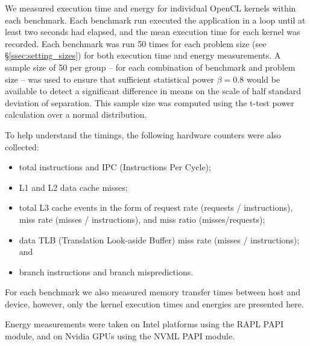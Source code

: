\documentclass[../document.tex]{subfiles}
\begin{document}
\label{ssec:measurements}


We measured execution time and energy for individual OpenCL kernels within each benchmark.
Each benchmark run executed the application in a loop until at least two seconds had elapsed, and the mean execution time for each kernel was recorded.
Each benchmark was run 50 times for each problem size (see \S\ref{ssec:setting_sizes}) for both execution time and energy measurements.
A sample size of 50 per group -- for each combination of benchmark and problem size -- was used to ensure that sufficient statistical power $\beta = 0.8$ would be available to detect a significant difference in means on the scale of half standard deviation of separation.
This sample size was computed using the t-test power calculation over a normal distribution.

To help understand the timings, the following hardware counters were also collected:
\begin{itemize}
	\item total instructions and IPC (Instructions Per Cycle);
	\item L1 and L2 data cache misses;
	\item total L3 cache events in the form of request rate (requests / instructions), miss rate (misses / instructions), and miss ratio (misses/requests);
	\item data TLB (Translation Look-aside Buffer) miss rate (misses / instructions); and
	\item branch instructions and branch mispredictions.
\end{itemize}
For each benchmark we also measured memory transfer times between host and device, however, only the kernel execution times and energies are presented here.

Energy measurements were taken on Intel platforms using the RAPL PAPI module, and on Nvidia GPUs using the NVML PAPI module.
\end{document}
